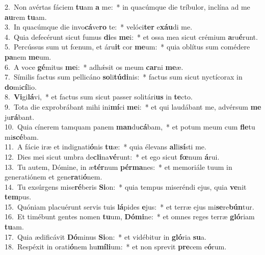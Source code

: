 {2.~}Non avértas fáciem \textbf{tu}am \textbf{a} me:~* in quacúmque die tríbulor, inclína ad me \textbf{au}rem \textbf{tu}am.\\
{3.~}In quacúmque die invo\textbf{cá}ve\textbf{ro} te:~* velóci\textbf{ter} e\textbf{xáu}di me.\\
{4.~}Quia defecérunt sicut fumus \textbf{di}es \textbf{me}i:~* et ossa mea sicut crémium \textbf{a}ru\textbf{é}runt.\\
{5.~}Percússus sum ut fœnum, et áru\textbf{it} cor \textbf{me}um:~* quia oblítus sum comédere \textbf{pa}nem \textbf{me}um.\\
{6.~}A voce \textbf{gé}mitus \textbf{me}i:~* adhǽsit os meum \textbf{car}ni \textbf{me}æ.\\
{7.~}Símilis factus sum pellicáno \textbf{so}li\textbf{tú}\textbf{di}nis:~* factus sum sicut nyctícorax in \textbf{do}mi\textbf{cí}lio.\\
{8.~}\textbf{Vi}gi\textbf{lá}vi,~* et factus sum sicut passer solitári\textbf{us} in \textbf{te}cto.\\
{9.~}Tota die exprobrábant mihi ini\textbf{mí}ci \textbf{me}i:~* et qui laudábant me, advérsum \textbf{me} ju\textbf{rá}bant.\\
{10.~}Quia cínerem tamquam panem \textbf{man}du\textbf{cá}bam,~* et potum meum cum \textbf{fle}tu mi\textbf{scé}bam.\\
{11.~}A fácie iræ et indignati\textbf{ó}nis \textbf{tu}æ:~* quia élevans \textbf{al}li\textbf{sí}sti me.\\
{12.~}Dies mei sicut umbra de\textbf{cli}na\textbf{vé}runt:~* et ego sicut \textbf{fœ}num \textbf{á}rui.\\
{13.~}Tu autem, Dómine, in æ\textbf{tér}num \textbf{pér}\textbf{ma}nes:~* et memoriále tuum in generatiónem et gene\textbf{ra}ti\textbf{ó}nem.\\
{14.~}Tu exsúrgens mise\textbf{ré}beris \textbf{Si}on:~* quia tempus miseréndi ejus, quia \textbf{ve}nit \textbf{tem}pus.\\
{15.~}Quóniam placuérunt servis tuis \textbf{lá}pides \textbf{e}jus:~* et terræ ejus mi\textbf{se}re\textbf{bún}tur.\\
{16.~}Et timébunt gentes nomen \textbf{tu}um, \textbf{Dó}\textbf{mi}ne:~* et omnes reges terræ \textbf{gló}riam \textbf{tu}am.\\
{17.~}Quia ædificávit \textbf{Dó}minus \textbf{Si}on:~* et vidébitur in \textbf{gló}ria \textbf{su}a.\\
{18.~}Respéxit in orati\textbf{ó}nem hu\textbf{mí}\textbf{li}um:~* et non sprevit \textbf{pre}cem e\textbf{ó}rum.\\
